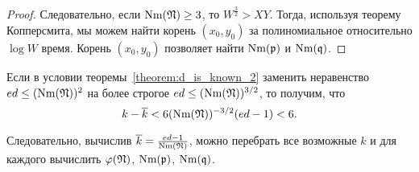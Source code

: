 \documentclass[_00_dissertation.tex]{subfiles}
\begin{document}
\begin{proof}
    Следовательно, если $\textrm{Nm}(\mathfrak{N}) \ge 3$, то $W^{\frac{3}{2}} > XY$.
    Тогда, используя теорему Копперсмита, мы можем найти корень $(x_0, y_0)$ за полиномиальное относительно $\log W$ время.
    Корень $(x_0, y_0)$ позволяет найти $\textrm{Nm}(\mathfrak{p})$ и $\textrm{Nm}(\mathfrak{q})$.
\end{proof}

\begin{remark}
    Если в условии теоремы~\ref{theorem:d_is_known_2} заменить неравенство $ed \le (\textrm{Nm}(\mathfrak{N}))^2$ на более строгое $e d \le (\textrm{Nm}(\mathfrak{N}))^{3/2}$, то получим, что
    \begin{equation*}
        k - \overline{k} < 6(\textrm{Nm}(\mathfrak{N}))^{-3/2}(ed-1) < 6.
    \end{equation*}
    
    Следовательно, вычислив $\overline{k} = \frac{ed-1}{\textrm{Nm}(\mathfrak{N})}$, можно перебрать все возможные $k$ и для каждого вычислить $\varphi(\mathfrak{N})$, $\textrm{Nm}(\mathfrak{p})$, $\textrm{Nm}(\mathfrak{q})$.
\end{remark}
\end{document}
